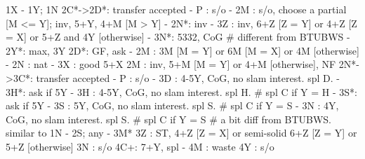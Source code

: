 1X - 1Y; 1N
2C*->2D*: transfer accepted
        - P  : s/o
        - 2M : s/o, choose a partial [M <= Y]; inv, 5+Y, 4+M [M > Y]
        - 2N*: inv
        - 3Z : inv, 6+Z [Z = Y] or 4+Z [Z = X] or 5+Z and 4Y [otherwise]
        - 3N*: 5332, CoG  # different from BTUBWS
   - 2Y*: max, 3Y
2D*: GF, ask 
   - 2M : 3M [M = Y] or 6M [M = X] or 4M [otherwise]
   - 2N : nat
   - 3X : good 5+X
2M : inv, 5+M [M = Y] or 4+M [otherwise], NF
2N*->3C*: transfer accepted
        - P  : s/o
        - 3D : 4-5Y, CoG, no slam interest. spl D.
             - 3H*: ask if 5Y
        - 3H : 4-5Y, CoG, no slam interest. spl H.  # spl C if Y = H
             - 3S*: ask if 5Y
        - 3S : 5Y, CoG, no slam interest. spl S.  # spl C if Y = S
        - 3N : 4Y, CoG, no slam interest. spl S.  # spl C if Y = S
        # a bit diff from BTUBWS. similar to 1N - 2S; any - 3M*
3Z : ST, 4+Z [Z = X] or semi-solid 6+Z [Z = Y] or 5+Z [otherwise]
3N : s/o
4C+: 7+Y, spl  
   - 4M : waste
4Y : s/o
